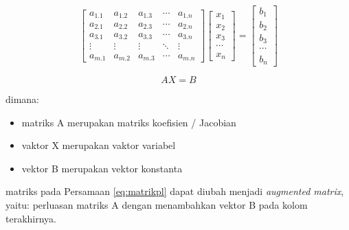 \documentclass[
]{book}
\providecommand{\tightlist}{%
  \setlength{\itemsep}{0pt}\setlength{\parskip}{0pt}}
\theoremstyle{definition}
\theoremstyle{definition}
\theoremstyle{definition}
\theoremstyle{definition}
\theoremstyle{remark}
\begin{document}
\begin{equation}
\begin{bmatrix}
     a_{1.1} & a_{1.2} & a_{1.3} &\cdots& a_{1.n}           \\[0.3em]
     a_{2.1} & a_{2.2} & a_{2.3} &\cdots& a_{2.n}           \\[0.3em]
     a_{3.1} & a_{3.2} & a_{3.3} &\cdots& a_{3.n}           \\[0.3em]
     \vdots  & \vdots  & \vdots  &\ddots& \vdots            \\[0.3em]
     a_{m.1} & a_{m.2} & a_{m.3} &\cdots& a_{m.n}
     \end{bmatrix}
\begin{bmatrix}
     x_1                                          \\[0.3em]
     x_2                                          \\[0.3em]
     x_3                                          \\[0.3em]
     \cdots                                       \\[0.3em]
     x_n                                       
     \end{bmatrix}
= \begin{bmatrix}
     b_1                                          \\[0.3em]
     b_2                                          \\[0.3em]
     b_3                                          \\[0.3em]
     \cdots                                       \\[0.3em]
     b_n                                       
     \end{bmatrix}
  \label{eq:matrikpl}
\end{equation}

\begin{equation}
AX=B
  \label{eq:matrikpl2}
\end{equation}

dimana:

\begin{itemize}
\tightlist
\item
  matriks A merupakan matriks koefisien / Jacobian
\item
  vaktor X merupakan vaktor variabel
\item
  vektor B merupakan vektor konstanta
\end{itemize}

matriks pada Persamaan \eqref{eq:matrikpl} dapat diubah menjadi \emph{augmented matrix}, yaitu: perluasan matriks A dengan menambahkan vektor B pada kolom terakhirnya.
\end{document}
